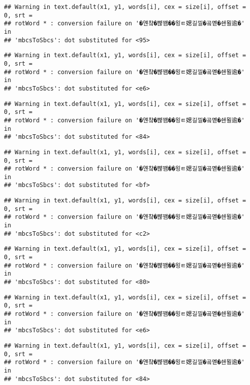 \documentclass[]{article}
\begin{document}
\begin{verbatim}
## Warning in text.default(x1, y1, words[i], cex = size[i], offset = 0, srt =
## rotWord * : conversion failure on '�얜챸�뺞꽴��욍ㅌ媤길낄�곸몓�쇈묄逾�' in
## 'mbcsToSbcs': dot substituted for <95>
\end{verbatim}

\begin{verbatim}
## Warning in text.default(x1, y1, words[i], cex = size[i], offset = 0, srt =
## rotWord * : conversion failure on '�얜챸�뺞꽴��욍ㅌ媤길낄�곸몓�쇈묄逾�' in
## 'mbcsToSbcs': dot substituted for <e6>
\end{verbatim}

\begin{verbatim}
## Warning in text.default(x1, y1, words[i], cex = size[i], offset = 0, srt =
## rotWord * : conversion failure on '�얜챸�뺞꽴��욍ㅌ媤길낄�곸몓�쇈묄逾�' in
## 'mbcsToSbcs': dot substituted for <84>
\end{verbatim}

\begin{verbatim}
## Warning in text.default(x1, y1, words[i], cex = size[i], offset = 0, srt =
## rotWord * : conversion failure on '�얜챸�뺞꽴��욍ㅌ媤길낄�곸몓�쇈묄逾�' in
## 'mbcsToSbcs': dot substituted for <bf>
\end{verbatim}

\begin{verbatim}
## Warning in text.default(x1, y1, words[i], cex = size[i], offset = 0, srt =
## rotWord * : conversion failure on '�얜챸�뺞꽴��욍ㅌ媤길낄�곸몓�쇈묄逾�' in
## 'mbcsToSbcs': dot substituted for <c2>
\end{verbatim}

\begin{verbatim}
## Warning in text.default(x1, y1, words[i], cex = size[i], offset = 0, srt =
## rotWord * : conversion failure on '�얜챸�뺞꽴��욍ㅌ媤길낄�곸몓�쇈묄逾�' in
## 'mbcsToSbcs': dot substituted for <80>
\end{verbatim}

\begin{verbatim}
## Warning in text.default(x1, y1, words[i], cex = size[i], offset = 0, srt =
## rotWord * : conversion failure on '�얜챸�뺞꽴��욍ㅌ媤길낄�곸몓�쇈묄逾�' in
## 'mbcsToSbcs': dot substituted for <e6>
\end{verbatim}

\begin{verbatim}
## Warning in text.default(x1, y1, words[i], cex = size[i], offset = 0, srt =
## rotWord * : conversion failure on '�얜챸�뺞꽴��욍ㅌ媤길낄�곸몓�쇈묄逾�' in
## 'mbcsToSbcs': dot substituted for <84>
\end{verbatim}
\end{document}
